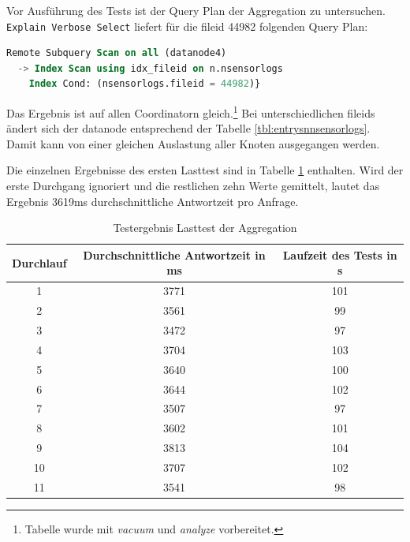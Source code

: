 Vor Ausführung des Tests ist der Query Plan der Aggregation zu untersuchen.
\verb+Explain Verbose Select+ liefert für die fileid 44982 folgenden Query Plan:
\begin{lstlisting}[language=sql,caption={Explain Verbose Ergebnis eines Coordinator}]
Remote Subquery Scan on all (datanode4)
  -> Index Scan using idx_fileid on n.nsensorlogs
    Index Cond: (nsensorlogs.fileid = 44982)}
\end{lstlisting}
Das Ergebnis ist auf allen Coordinatorn gleich.\footnote{Tabelle wurde mit \textit{vacuum} und \textit{analyze} vorbereitet.}
Bei unterschiedlichen fileids ändert sich der datanode entsprechend der Tabelle \ref{tbl:entrysnnsensorlogs}.
Damit kann von einer gleichen Auslastung aller Knoten ausgegangen werden.

Die einzelnen Ergebnisse des ersten Lasttest sind in Tabelle \ref{tbl:ergebnisseTest1} enthalten.
Wird der erste Durchgang ignoriert und die restlichen zehn Werte gemittelt, lautet das Ergebnis 3619ms durchschnittliche Antwortzeit pro Anfrage.
\begin{table}[h!]
\centering
\begin{tabular}{c|c|c}
\textbf{Durchlauf} & \textbf{Durchschnittliche Antwortzeit in ms} & \textbf{Laufzeit des Tests in s} \\ \hline
1 & 3771 & 101 \\ \hline
2 & 3561 & 99 \\ \hline
3 & 3472 & 97 \\ \hline
4 & 3704 & 103 \\ \hline 
5 & 3640 & 100 \\ \hline
6 & 3644 & 102 \\ \hline
7 & 3507 & 97 \\ \hline
8 & 3602 & 101 \\ \hline 
9 & 3813 & 104 \\ \hline
10 & 3707 & 102 \\ \hline
11 & 3541 & 98 \\ 			
\end{tabular}
\caption[Testergebnis Lasttest Aggregation]{Testergebnis Lasttest der Aggregation}
\label{tbl:ergebnisseTest1}
\end{table}


